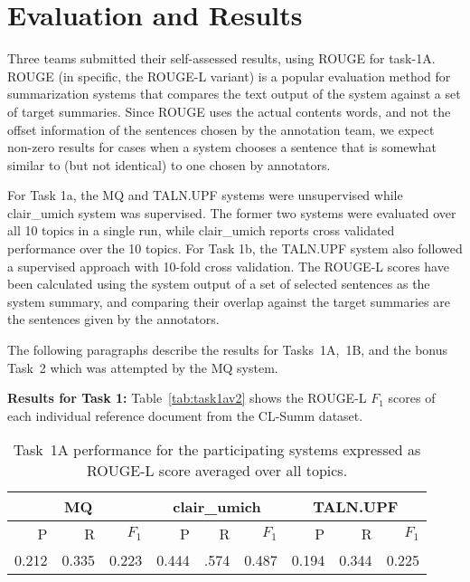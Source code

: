 \documentclass[11pt]{article}
\begin{document}
\section{Evaluation and Results}
Three teams submitted their self-assessed results, using ROUGE \cite{Lin:2004} 
for task-1A. ROUGE (in specific, the ROUGE-L variant) is a popular evaluation 
method for summarization systems that compares the text output of the system 
against a set of target summaries. Since ROUGE uses the actual contents words,
 and not the offset information of the sentences chosen by the annotation team, 
 we expect non-zero results for cases when a system chooses a sentence that is 
 somewhat similar to (but not identical) to one chosen by annotators.

For Task 1a, the MQ and TALN.UPF systems were unsupervised while clair\_umich 
system was supervised. The former two systems were evaluated over all 10 topics in 
a single run, while clair\_umich reports cross validated performance over the 10 topics. 
For Task 1b, the TALN.UPF system also followed a supervised approach with 10-fold cross 
validation. The ROUGE-L scores have been calculated using the system output of a set 
of selected sentences as the system summary, and comparing their overlap
against the target summaries are the sentences given by the annotators. 

The following paragraphs describe the results for Tasks~1A,~1B, and the
bonus Task~2 which was attempted by the MQ system.

\noindent\textbf{Results for Task 1:} 
Table~\ref{tab:task1av2} shows the ROUGE-L $F_1$ scores of each individual 
reference document from the CL-Summ dataset.

\begin{table*}
\centering
	\begin{tabular}{|r|r|r|r|r|r|r|r|r|}
	\hline
	\multicolumn{3}{|c|}{MQ} & \multicolumn{3}{|c|}{clair\_umich} & \multicolumn{3}{|c|}{TALN.UPF}\\
	\hline
	P & R & $F_1$ & P & R & $F_1$ & P & R & $F_1$\\
	\hline
 	0.212& 0.335& 0.223& 0.444& .574& 0.487& 0.194& 0.344& 0.225\\
	\hline
	\end{tabular}
\caption{Task~1A performance for the participating systems expressed as ROUGE-L score
 averaged over all topics.}
\label{tab:task1a}
\end{table*}
\end{document}
